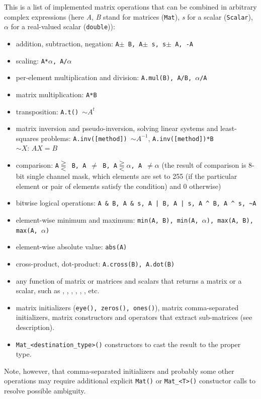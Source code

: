 
This is a list of implemented matrix operations that can be combined in arbitrary complex expressions
(here \emph{A}, \emph{B} stand for matrices (\texttt{Mat}), \emph{s} for a scalar (\texttt{Scalar}),
\emph{$\alpha$} for a real-valued scalar (\texttt{double})):

\begin{itemize}
    \item addition, subtraction, negation: \texttt{A$\pm$ B, A$\pm$ s, s$\pm$ A, -A}
    \item scaling: \texttt{A*$\alpha$, A/$\alpha$}
    \item per-element multiplication and division: \texttt{A.mul(B), A/B, $\alpha$/A}
    \item matrix multiplication: \texttt{A*B}
    \item transposition: \texttt{A.t() $\sim A^t$}
    \item matrix inversion and pseudo-inversion, solving linear systems and least-squares problems:
        \texttt{A.inv([method]) $\sim A^{-1}$}, \texttt{A.inv([method])*B $\sim X:\,AX=B$}
    \item comparison: \texttt{A$\gtreqqless$ B, A $\ne$ B, A$\gtreqqless \alpha$, A $\ne \alpha$}
          (the result of comparison is 8-bit single channel mask, which elements are set to 255
          (if the particular element or pair of elements satisfy the condition) and 0 otherwise)
    \item bitwise logical operations: \verb"A & B, A & s, A | B, A | s, A ^ B, A ^ s, ~A"
    \item element-wise minimum and maximum: \texttt{min(A, B), min(A, $\alpha$), max(A, B), max(A, $\alpha$)}
    \item element-wise absolute value: \texttt{abs(A)}
    \item cross-product, dot-product: \texttt{A.cross(B), A.dot(B)}
    \item any function of matrix or matrices and scalars that returns a matrix or a scalar, such as
          , , , , ,
          ,  etc.
    \item matrix initializers (\texttt{eye(), zeros(), ones()}), matrix comma-separated initializers,
          matrix constructors and operators that extract sub-matrices (see  description).
    \item \verb"Mat_<destination_type>()" constructors to cast the result to the proper type.
\end{itemize}
Note, however, that comma-separated initializers and probably some other operations may require additional explicit \texttt{Mat()} or \verb"Mat_<T>()" constuctor calls to resolve possible ambiguity.

